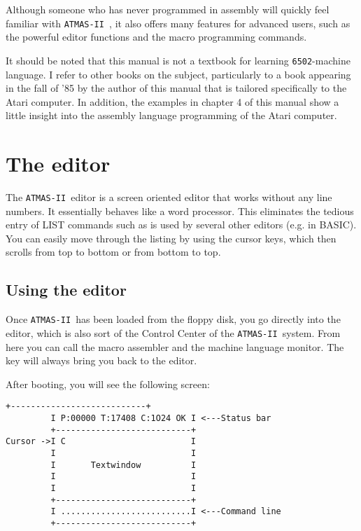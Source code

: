 \documentclass[10pt,a4paper,twoside,final,openright,titlepage]{memoir}
\def\atmas{\texttt{AT\-MAS-II }}
\newcommand{\key}[1]{\keystroke{\tiny #1}}
\begin{document}
Although someone who has never programmed in assembly will quickly feel familiar with \atmas, it also
offers many features for advanced users, such as the powerful editor functions and the macro
programming commands.

It should be noted that this manual is not a textbook for learning \texttt{6502}-machine language.
I refer to other books on the subject, particularly to a book appearing in the fall of '85 by
the author of this manual that is tailored specifically to the Atari computer.
In addition, the examples in chapter 4 of this manual show a little  insight  into the assembly
language  programming  of the Atari  computer.

\chapter{The editor}

The \atmas editor is a screen oriented editor that works without any line numbers.
It essentially behaves like a word processor.
This eliminates the tedious entry of LIST commands such as is used by several other
editors (e.g. in BASIC).
You can easily move through the listing by using the cursor keys,
which then scrolls from top to bottom or from bottom to top.

\section{Using the editor}

Once \atmas has been loaded from the floppy disk, you go directly into the editor,
which is also sort of the Control Center of the \atmas system.
From here you can call the macro assembler and the machine language monitor.
The \key{RESET} key will always bring you back to the editor.

After booting, you will see the following screen:

\begin{Verbatim}[samepage=true]
         +---------------------------+
         I P:00000 T:17408 C:1O24 OK I <---Status bar
         +---------------------------+
Cursor ->I C                         I
         I                           I
         I       Textwindow          I
         I                           I
         I                           I
         +---------------------------+
         I ..........................I <---Command line
         +---------------------------+
\end{Verbatim}
\end{document}
